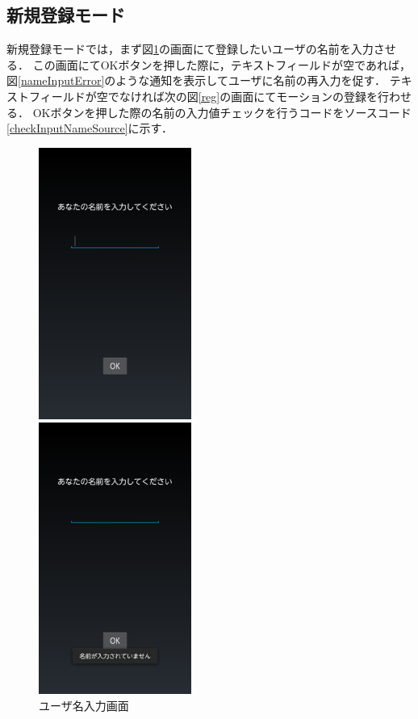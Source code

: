 \documentclass[11pt]{jreport}
\begin{document}
	    \subsection{新規登録モード}
        新規登録モードでは，まず図\ref{nameInput}の画面にて登録したいユーザの名前を入力させる．
        この画面にてOKボタンを押した際に，テキストフィールドが空であれば，図\ref{nameInputError}のような通知を表示してユーザに名前の再入力を促す．
        テキストフィールドが空でなければ次の図\ref{reg}の画面にてモーションの登録を行わせる．
        OKボタンを押した際の名前の入力値チェックを行うコードをソースコード\ref{checkInputNameSource}に示す．

        \begin{figure}[htbp]
            \begin{minipage}{0.33\hsize}
                \begin{center}
                    \includegraphics[width=5cm, bb=0 0 540 960]{NameInput.pdf}
                \end{center}
                \caption{ユーザ名入力画面}
                \label{nameInput}
            \end{minipage}
            \begin{minipage}{0.33\hsize}
                \begin{center}
                    \includegraphics[width=5cm, bb=0 0 540 960]{NameInputError.pdf}

\end{center}
\end{minipage}
\end{figure}
\end{document}
